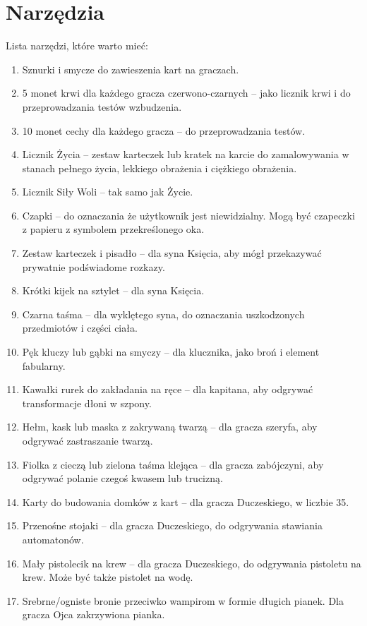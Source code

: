 \section{Narzędzia}
	Lista narzędzi, które warto mieć:
	\begin{enumerate}
		\item Sznurki i smycze do zawieszenia kart na graczach.
		\item 5 monet krwi dla każdego gracza czerwono-czarnych -- jako licznik krwi i do przeprowadzania testów wzbudzenia.
		\item 10 monet cechy dla każdego gracza -- do przeprowadzania testów.
		\item Licznik Życia -- zestaw karteczek lub kratek na karcie do zamalowywania w stanach pełnego życia, lekkiego obrażenia i ciężkiego obrażenia.
		\item Licznik Siły Woli -- tak samo jak Życie.
		\item Czapki -- do oznaczania że użytkownik jest niewidzialny. Mogą być czapeczki z papieru z symbolem przekreślonego oka.
		\item Zestaw karteczek i pisadło -- dla syna Księcia, aby mógł przekazywać prywatnie podświadome rozkazy.
		\item Krótki kijek na sztylet -- dla syna Księcia.
		\item Czarna taśma -- dla wyklętego syna, do oznaczania uszkodzonych przedmiotów i części ciała.
		\item Pęk kluczy lub gąbki na smyczy -- dla klucznika, jako broń i element fabularny.
		\item Kawałki rurek do zakładania na ręce -- dla kapitana, aby odgrywać transformacje dłoni w szpony.
		\item Hełm, kask lub maska z zakrywaną twarzą -- dla gracza szeryfa, aby odgrywać zastraszanie twarzą.
		\item Fiolka z cieczą lub zielona taśma klejąca -- dla gracza zabójczyni, aby odgrywać polanie czegoś kwasem lub trucizną.
		\item Karty do budowania domków z kart -- dla gracza Duczeskiego, w liczbie 35.
		\item Przenośne stojaki -- dla gracza Duczeskiego, do odgrywania stawiania automatonów.
		\item Mały pistolecik na krew -- dla gracza Duczeskiego, do odgrywania pistoletu na krew. Może być także pistolet na wodę.
		\item Srebrne/ogniste bronie przeciwko wampirom w formie długich pianek. Dla gracza Ojca zakrzywiona pianka.

\end{enumerate}
